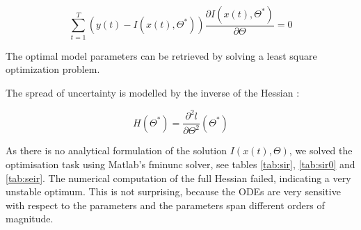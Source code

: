 \documentclass[11pt, a4paper]{article}
\begin{document}
\begin{equation}
\sum_{t=1}^T (y(t) - I(x(t), \Theta^*)) \frac{\partial I(x(t), \Theta^*)}{\partial \Theta} = 0
\end{equation}

The optimal model parameters can be retrieved by solving a least square optimization problem. 

The spread of uncertainty is modelled by the inverse of the Hessian :

\begin{equation}
H(\Theta^*) = \frac{\partial^2 l}{\partial \Theta^2} (\Theta^*) 
\end{equation}

As there is no analytical formulation of the solution $I(x(t), \Theta)$, we solved the optimisation task using Matlab's fminunc solver, see tables \ref{tab:sir}, \ref{tab:sir0} and \ref{tab:seir}. The numerical computation of the full Hessian failed, indicating a very unstable optimum. This is not surprising, because the ODEs are very sensitive with respect to the parameters and the parameters span different orders of magnitude.
\end{document}
